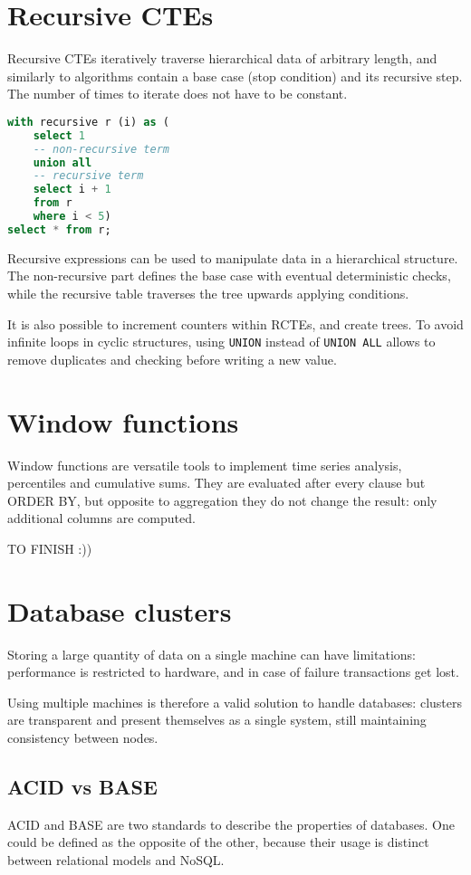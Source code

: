 \section{Recursive CTEs}
Recursive CTEs iteratively traverse hierarchical data of arbitrary length, and similarly to algorithms contain a base case (stop condition) and its recursive step. The number of times to iterate does not have to be constant.

\begin{lstlisting}[language=SQL]
with recursive r (i) as (
	select 1
	-- non-recursive term
	union all
	-- recursive term
	select i + 1
	from r
	where i < 5)
select * from r;
\end{lstlisting}

Recursive expressions can be used to manipulate data in a hierarchical structure. The non-recursive part defines the base case with eventual deterministic checks, while the recursive table traverses the tree upwards applying conditions.

It is also possible to increment counters within RCTEs, and create trees. To avoid infinite loops in cyclic structures, using \texttt{UNION} instead of \texttt{UNION ALL} allows to remove duplicates and checking before writing a new value.

\section{Window functions}
Window functions are versatile tools to implement time series analysis, percentiles and cumulative sums. They are evaluated after every clause but ORDER BY, but opposite to aggregation they do not change the result: only additional columns are computed.

TO FINISH :))

\section{Database clusters}
Storing a large quantity of data on a single machine can have limitations: performance is restricted to hardware, and in case of failure transactions get lost. 

Using multiple machines is therefore a valid solution to handle databases: clusters are transparent and present themselves as a single system, still maintaining consistency between nodes. 

\subsection{ACID vs BASE}
ACID and BASE are two standards to describe the properties of databases. One could be defined as the opposite of the other, because their usage is distinct between relational models and NoSQL.

